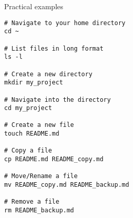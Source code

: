 \begin{frame}[fragile]{Practical examples}
	\begin{verbatim}
# Navigate to your home directory
cd ~

# List files in long format
ls -l

# Create a new directory
mkdir my_project

# Navigate into the directory
cd my_project

# Create a new file
touch README.md

# Copy a file
cp README.md README_copy.md

# Move/Rename a file
mv README_copy.md README_backup.md

# Remove a file
rm README_backup.md
	\end{verbatim}
\end{frame}
